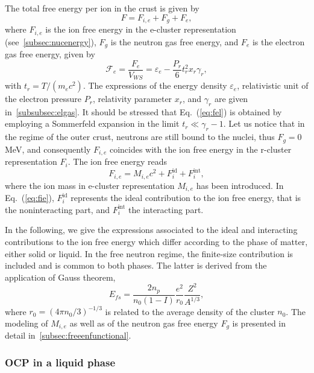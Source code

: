The total free energy per ion in the crust is given by
%
\begin{equation}
  F = F_{i,e} + F_g + F_e,\label{eq:fperion}
\end{equation}
%
where $F_{i,e}$ is the ion free energy in the e-cluster representation 
(see~\ref{subsec:nucenergy}), $F_g$ is the neutron gas free energy, and $F_e$ 
is the electron gas free energy, given by~\cite{Haensel2007}
%
\begin{equation}
  \mathcal{F}_e = \frac{F_e}{V_{WS}} = \varepsilon_e -
  \frac{P_r}{6}t_r^2x_r\gamma_r,\label{eq:fel}
\end{equation}
%
with $t_r = T/(m_e c^2)$. The expressions of the energy density 
$\varepsilon_e$, relativistic unit of the electron pressure $P_r$, relativity
parameter $x_r$, and $\gamma_r$ are given in~\ref{subsubsec:elgas}. It should
be stressed that Eq.~(\ref{eq:fel}) is obtained by employing a Sommerfeld
expansion in the limit $t_r \ll \gamma_r - 1$.
Let us notice that in the regime of the outer crust, neutrons are still bound
to the nuclei, thus $F_g=0$ MeV, and consequently $F_{i,e}$ coincides with the 
ion free energy in the r-cluster representation $F_i$.
The ion free energy reads
%
\begin{equation}
  F_{i,e} = M_{i,e} c^2 + F_i^{\text{id}} + F_i^{\text{int}},\label{eq:fie}
\end{equation}
%
where the ion mass in e-cluster representation $M_{i,e}$ has been introduced.
In Eq.~(\ref{eq:fie}), $F_i^{\text{id}}$ represents the ideal contribution to
the ion free energy, that is the noninteracting part, and $F_i^{\text{int}}$
the interacting part.

In the following, we give the expressions associated to the ideal and 
interacting contributions to the ion free energy which differ according to the 
phase of matter, either solid or liquid. In the free neutron regime, the 
finite-size contribution is included and is common to both phases. The latter 
is derived from the application of Gauss theorem,
%
\begin{equation}
  E_{fs} = \frac{2n_p}{n_0(1-I)}\frac{e^2}{r_0}\frac{Z^2}{A^{1/3}},
\end{equation}
%
where $r_0=(4\pi n_0/3)^{-1/3}$ is related to the average density of the
cluster $n_0$.
The modeling of $M_{i,e}$ as well as of the neutron gas free energy $F_g$ is 
presented in detail in~\ref{subsec:freeenfunctional}. 

\subsubsection{OCP in a liquid phase}

